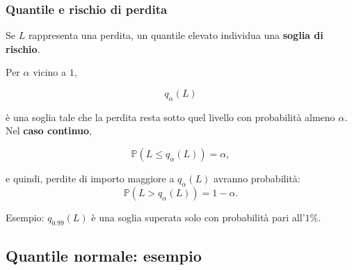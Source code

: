\documentclass[handout]{beamer}%
\providecommand{\Prob}{\mathbb{P}}
\providecommand{\1}{\mathbf{1}}
\providecommand{\QTR}[2]{\csname #1\endcsname{#2}}
\begin{document}
\begin{frame}%
%

\frametitle{Quantile e rischio di perdita}%


Se $L$ rappresenta una perdita, un quantile elevato individua una
\textbf{soglia di rischio}.

\medskip

Per $\alpha$ vicino a $1$,%

\[
q_{\alpha}(L)
\]


\`{e} una soglia tale che la perdita resta sotto quel livello con
probabilit\`{a} almeno $\alpha$. Nel \textbf{caso continuo},%

\[
\Prob(L\leq q_{\alpha}(L))=\alpha,
\]


\medskip

e quindi, perdite di importo maggiore a $q_{\alpha}(L)$ avranno
probabilit\`{a}:
\[
\Prob(L>q_{\alpha}(L))=1-\alpha.
\]


\medskip

Esempio: $q_{0.99}(L)$ \`{e} una soglia superata solo con probabilit\`{a} pari
all'$1\%$.%

\transboxout
\end{frame}%




\subsection{Quantile normale: esempio}%
\end{document}
